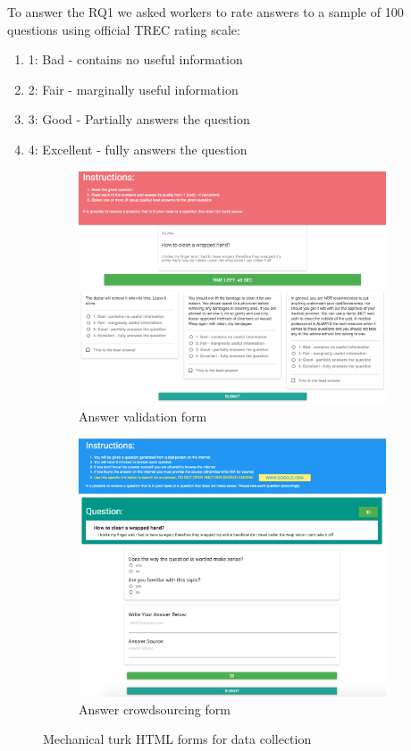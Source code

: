 \documentclass[11pt,letterpaper]{article}
\begin{document}
To answer the RQ1 we asked workers to rate answers to a sample of 100 questions using official TREC rating scale:
\begin{enumerate}
\item 1: Bad - contains no useful information
\item 2: Fair - marginally useful information
\item 3: Good - Partially answers the question
\item 4: Excellent - fully answers the question
\end{enumerate}

\begin{figure}[Ht!]
\centering
	\begin{subfigure}{.49\textwidth}
	\includegraphics[width=1.0\linewidth]{img/validation_screenshot}
	\caption{Answer validation form}
	\label{fig:interfaces:validation}
	\end{subfigure}
	\begin{subfigure}{.49\textwidth}
	\centering
	\includegraphics[width=0.9\linewidth]{img/answering_screenshot}
	\caption{Answer crowdsourcing form}
	\label{fig:interfaces:answer}
	\end{subfigure}
\caption{Mechanical turk HTML forms for data collection}
\label{fig:interfaces}
\end{figure}
\end{document}
